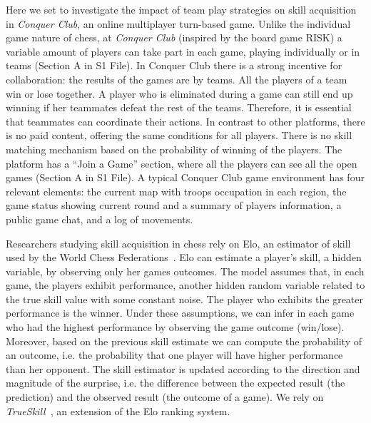 \documentclass[a4paper,10pt]{book}
\theoremstyle{definition}
\begin{document}
Here we set to investigate the impact of team play strategies on skill acquisition in \emph{Conquer Club}, an online multiplayer turn-based game.
Unlike the individual game nature of chess, at \emph{Conquer Club} (inspired by the board game RISK) a variable amount of players can take part in each game, playing individually or in teams (Section A in S1 File).
In Conquer Club there is a strong incentive for collaboration: the results of the games are by teams.
All the players of a team win or lose together.
A player who is eliminated during a game can still end up winning if her teammates defeat the rest of the teams.
Therefore, it is essential that teammates can coordinate their actions.
In contrast to other platforms, there is no paid content, offering the same conditions for all players.
There is no skill matching mechanism based on the probability of winning of the players.
The platform has a ``Join a Game'' section, where all the players can see all the open games (Section A in S1 File).
A typical Conquer Club game environment has four relevant elements: the current map with troops occupation in each region, the game status showing current round and a summary of players information, a public game chat, and a log of movements.

Researchers studying skill acquisition in chess rely on Elo, an estimator of skill used by the World Chess Federations~\cite{glickman1995-guideToChessRatings,glickman2001}.
Elo can estimate a player's skill, a hidden variable, by observing only her games outcomes.
The model assumes that, in each game, the players exhibit performance, another hidden random variable related to the true skill value with some constant noise.
The player who exhibits the greater performance is the winner.
Under these assumptions, we can infer in each game who had the highest performance by observing the game outcome (win/lose).
Moreover, based on the previous skill estimate we can compute the probability of an outcome, i.e. the probability that one player will have higher performance than her opponent.
The skill estimator is updated according to the direction and magnitude of the surprise, i.e. the difference between the expected result (the prediction) and the observed result (the outcome of a game).
We rely on \emph{TrueSkill}~\cite{herbrich2006-trueskill}, an extension of the Elo ranking system.
\end{document}
